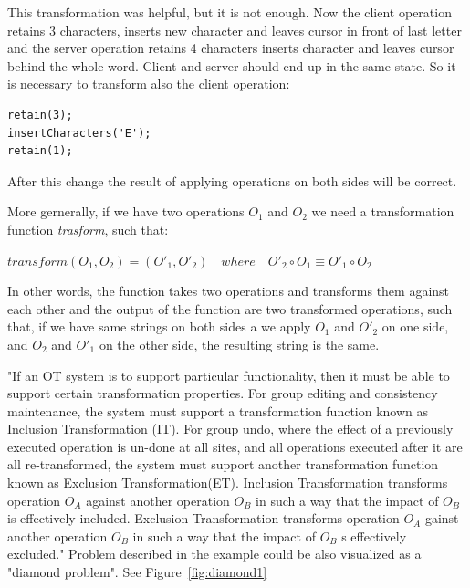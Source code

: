 \documentclass[12pt,oneside]{fithesis2}
\begin{document}
\vspace{3mm}
This transformation was helpful, but it is not enough. Now the client operation retains 3 characters, inserts new character and leaves cursor in front of last letter and the server operation retains 4 characters inserts character and leaves cursor behind the whole word. Client and server should end up in the same state. So it is necessary to transform also the client operation: 
\vspace{3mm}
\begin{verbatim}
retain(3);
insertCharacters('E');
retain(1);
\end{verbatim}
\vspace{3mm}
After this change the result of applying operations on both sides will be correct.\par More gernerally, if we have two operations \(O_{1}\) and  \(O_{2}\) we need a transformation function \textit{trasform}, such that: 
\begin{center}
\(transform(O_{1},O_{2}) = (O'_{1},O'_{2}) \quad where \quad O'_{2} \circ O_{1} \equiv O'_{1} \circ O_{2} \) 
\end{center}
In other words, the function takes two operations and transforms them against each other and the output of the function are two transformed operations, such that, if we have same strings on both sides a we apply \( O_{1} \) and \(O'_{2}\) on one side, and \( O_{2} \) and  \( O'_{1} \) on the other side, the resulting string is the same. 
\par "If an OT system is to support particular functionality, then it must be able to support certain transformation properties. For group editing and consistency maintenance, the system must support a transformation function known as Inclusion Transformation (IT). For group undo, where the effect of a previously executed operation is un-done at all sites, and all operations executed after it are all re-transformed, the system must support another transformation function known as Exclusion Transformation(ET). Inclusion Transformation transforms operation \( O_{A} \) against another operation \( O_{B} \) in such a way that the impact of \( O_{B} \) is effectively included. Exclusion Transformation transforms operation \( O_{A} \) gainst another operation \( O_{B} \) in such a way that the impact of \( O_{B} \) s effectively excluded." \cite{Leung} Problem described in the example could be also visualized as a "diamond problem". See Figure~\ref{fig:diamond1}
\end{document}
